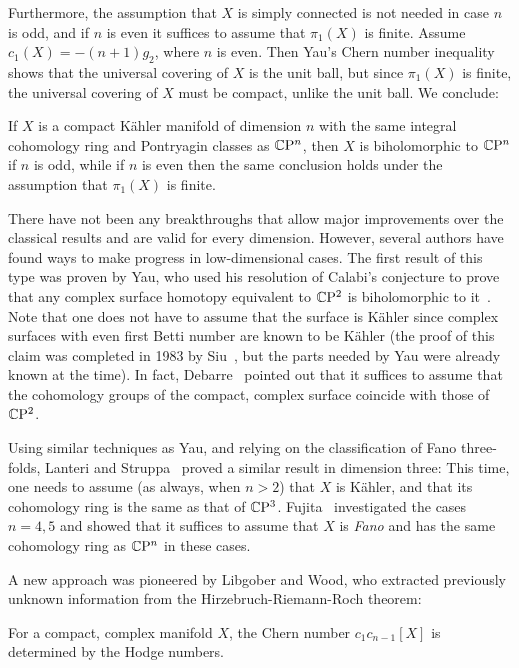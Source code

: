 Furthermore, the assumption that $X$ is simply connected is not needed in case $n$ is odd, and if $n$ is even it suffices to assume that $\pi_1(X)$ is finite. Assume $c_1(X)=-(n+1)g_2$, where $n$ is even. Then Yau's Chern number inequality shows that the universal covering of $X$ is the unit ball, but since $\pi_1(X)$ is finite, the universal covering of $X$ must be compact, unlike the unit ball. We conclude:

\begin{prop}[Li~\cite{Li2016}]
	If $X$ is a compact K\"ahler manifold of dimension $n$ with the same integral cohomology ring and Pontryagin classes as $\mathbb{C}\mathrm{P}^n$, then $X$ is biholomorphic to $\mathbb{C}\mathrm{P}^n$ if $n$ is odd, while if $n$ is even then the same conclusion holds under the assumption that $\pi_1(X)$ is finite.
\end{prop}

There have not been any breakthroughs that allow major improvements over the classical results and are valid for every dimension. However, several authors have found ways to make progress in low-dimensional cases. The first result of this type was proven by Yau, who used his resolution of Calabi's conjecture to prove that any complex surface homotopy equivalent to $\mathbb{C}\mathrm{P}^2$ is biholomorphic to it~\cite{Yau1977}. Note that one does not have to assume that the surface is K\"ahler since complex surfaces with even first Betti number are known to be K\"ahler (the proof of this claim was completed in 1983 by Siu~\cite{Siu1983}, but the parts needed by Yau were already known at the time). In fact, Debarre~\cite{Deb2015} pointed out that it suffices to assume that the cohomology groups of the compact, complex surface coincide with those of $\mathbb{C}\mathrm{P}^2$.

Using similar techniques as Yau, and relying on the classification of Fano three-folds, Lanteri and Struppa~\cite{LS1986} proved a similar result in dimension three: This time, one needs to assume (as always, when $n>2$) that $X$ is K\"ahler, and that its cohomology ring is the same as that of $\mathbb{C}\mathrm{P}^3$. Fujita~\cite{Fuj1980a} investigated the cases $n=4,5$ and showed that it suffices to assume that $X$ is \emph{Fano} and has the same cohomology ring as $\mathbb{C}\mathrm{P}^n$ in these cases. 

A new approach was pioneered by Libgober and Wood, who extracted previously unknown information from the Hirzebruch-Riemann-Roch theorem:

\begin{thm}\label{thm:LibgoberWoodChern}
	For a compact, complex manifold $X$, the Chern number $c_1c_{n-1}[X]$ is determined by the Hodge numbers.
\end{thm}

